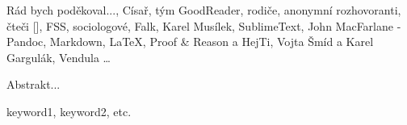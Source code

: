 \documentclass[12pt,oneside,final]{fithesis2}
\begin{document}
\FrontMatter
\ThesisTitlePage

\begin{ThesisDeclaration}
\DeclarationText
\AdvisorName
\end{ThesisDeclaration}

\begin{ThesisThanks}
Rád bych poděkoval..., Císař, tým GoodReader, rodiče, anonymní rozhovoranti, čteči [], FSS, sociologové, Falk, Karel Musílek, SublimeText, John MacFarlane - Pandoc, Markdown, LaTeX, Proof & Reason a HejTi, Vojta Šmíd a Karel Gargulák, Vendula …
\end{ThesisThanks}

\begin{ThesisAbstract}
Abstrakt...
\end{ThesisAbstract}

\begin{ThesisKeyWords}
keyword1, keyword2, etc.
\end{ThesisKeyWords}

\MainMatter

\tableofcontents          %





\end{document}
